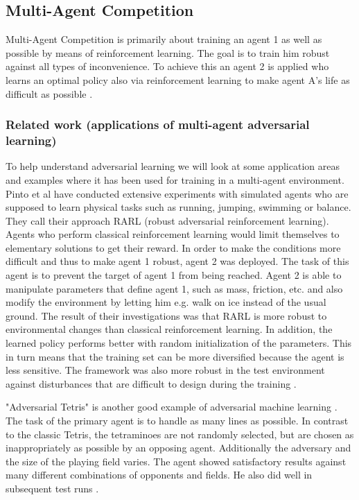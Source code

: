 \subsection{Multi-Agent Competition}
\label{multiagent}
Multi-Agent Competition is primarily about training an agent 1 as well as possible by means of reinforcement learning. The goal is to train him robust against all types of inconvenience.
To achieve this an agent 2 is applied who learns an optimal policy also via reinforcement learning to make agent A's life as difficult as possible \cite{robustPinto2017Mar}.

\subsubsection{Related work (applications of multi-agent adversarial learning)}

To help understand adversarial learning we will look at some application areas and examples where it has been used for training in a multi-agent environment.\\

Pinto et al \cite{robustPinto2017Mar} have conducted extensive experiments with simulated agents who are supposed to learn physical tasks such as running, jumping, swimming or balance. They call their approach RARL (robust adversarial reinforcement learning). Agents who perform classical reinforcement learning would limit themselves to elementary solutions to get their reward. In order to make the conditions more difficult and thus to make agent 1 robust, agent 2 was deployed. The task of this agent is to prevent the target of agent 1 from being reached. Agent 2 is able to manipulate parameters that define agent 1, such as mass, friction, etc. and also modify the environment by letting him e.g. walk on ice instead of the usual ground.
The result of their investigations was that RARL is more robust to environmental changes than classical reinforcement learning. In addition, the learned policy performs better with random initialization of the parameters. This in turn means that the training set can be more diversified because the agent is less sensitive. The framework was also more robust in the test environment against disturbances that are difficult to design during the training \cite{robustPinto2017Mar}.

"Adversarial Tetris" is another good example of adversarial machine learning \cite{tetrisRovatsou2010May}. The task of the primary agent is to handle as many lines as possible. In contrast to the classic Tetris, the tetraminoes are not randomly selected, but are chosen as inappropriately as possible by an opposing agent. Additionally the adversary and the size of the playing field varies. 
The agent showed satisfactory results against many different combinations of opponents and fields. He also did well in subsequent test runs \cite{tetrisRovatsou2010May}.

